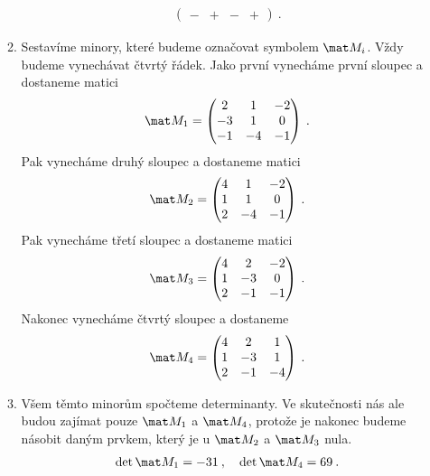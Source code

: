 \begin{itemize}
\begin{example}
\begin{enumerate}
\begin{align}
\begin{pmatrix}
                    \boldsymbol{-} & \boldsymbol{+} & \boldsymbol{-} & \boldsymbol{+}
                \end{pmatrix} \:.
            \end{align}
            \item Sestavíme minory, které budeme označovat symbolem $\mat M_i$. Vždy budeme vynechávat čtvrtý řádek. Jako první vynecháme první sloupec a dostaneme matici
            \begin{align}
                \mat M_1 = \left(\begin{matrix}
                    2 & 1 & -2 \\
                    -3 & 1 & 0 \\
                    -1 & -4 & -1
                    \end{matrix}\right) \:.
            \end{align}
            Pak vynecháme druhý sloupec a dostaneme matici
            \begin{align}
                \mat M_2 = \left(\begin{matrix}
                    4 & 1 & -2 \\
                    1 & 1 & 0 \\
                    2 & -4 & -1
                    \end{matrix}\right) \:.
            \end{align}
            Pak vynecháme třetí sloupec a dostaneme matici
            \begin{align}
                \mat M_3 = \left(\begin{matrix}
                4 & 2 & -2 \\
                1 & -3 & 0 \\
                2 & -1 & -1
                \end{matrix}\right) \:.
            \end{align}
            Nakonec vynecháme čtvrtý sloupec a dostaneme
            \begin{align}
                \mat M_4 = \left(\begin{matrix}
                    4 & 2 & 1 \\
                    1 & -3 & 1  \\
                    2 & -1 & -4
                \end{matrix}\right) \:.
            \end{align}

            \item Všem těmto minorům spočteme determinanty. Ve skutečnosti nás ale budou zajímat pouze $\mat M_1$ a $\mat M_4$, protože je nakonec budeme násobit daným prvkem, který je u $\mat M_2$ a $\mat M_3$ nula.
            \begin{align}
                \det \mat M_1 = -31 \:, \quad \det \mat M_4 = 69 \:.
            \end{align}


\end{enumerate}
\end{example}
\end{itemize}
